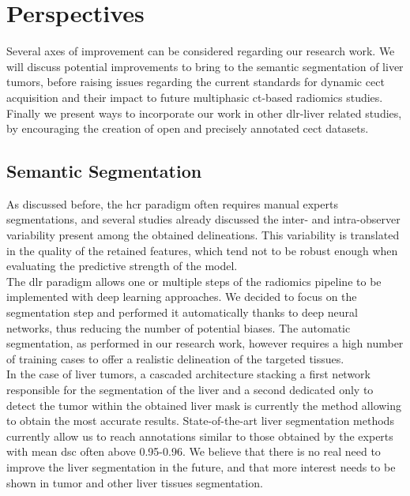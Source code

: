 \section{Perspectives}

Several axes of improvement can be considered regarding our research work.
We will discuss potential improvements to bring to the 
semantic segmentation of liver tumors, before raising issues regarding
the current standards for dynamic \ac{cect} acquisition and their impact to 
future multiphasic \ac{ct}-based radiomics studies.
Finally we present ways to incorporate our work in other \ac{dlr}-liver related 
studies, by encouraging the creation of open and precisely 
annotated \ac{cect} datasets.

\subsection{Semantic Segmentation}

As discussed before, the \ac{hcr} paradigm often requires manual experts
segmentations, and several studies already discussed the inter- and
intra-observer variability present among the obtained delineations. This
variability is translated in the quality of the retained features, which
tend not to be robust enough when evaluating the predictive 
strength of the model.\\
The \ac{dlr} paradigm allows one or multiple steps of the radiomics pipeline to be implemented with deep learning approaches. We decided to focus on the segmentation step and performed it automatically thanks to deep neural networks, thus reducing the number of potential biases. The automatic segmentation, as
performed in our research work, however requires a high number of
training cases to offer a realistic delineation of the targeted tissues.\\
In the case of liver tumors, a cascaded architecture stacking a first
network responsible for the segmentation of the liver and a second
dedicated only to detect the tumor within the obtained liver mask is
currently the method allowing to obtain the most accurate results.
State-of-the-art liver segmentation methods currently allow us to reach
annotations similar to those obtained by the experts with mean \ac{dsc} often
above 0.95-0.96. We believe that there is no real need to improve the
liver segmentation in the future, and that more interest needs to be
shown in tumor and other liver tissues segmentation.

